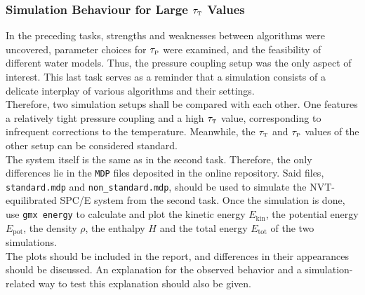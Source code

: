 \documentclass[9pt,tutorial]{livecoms}
\newcommand{\code}[1]{\colorbox{light-gray}{\texttt{#1}}}
\begin{document}
\subsubsection*{Simulation Behaviour for Large $\tau_\text{\tiny T}$ Values}
In the preceding tasks, strengths and weaknesses between algorithms were uncovered, parameter choices for $\tau_\text{\tiny P}$ were examined, and the feasibility of different water models. Thus, the pressure coupling setup was the only aspect of interest. This last task serves as a reminder that a simulation consists of a delicate interplay of various algorithms and their settings.\\
Therefore, two simulation setups shall be compared with each other. One features a relatively tight pressure coupling and a high $\tau_\text{\tiny T}$ value, corresponding to infrequent corrections to the temperature. Meanwhile, the $\tau_\text{\tiny T}$ and $\tau_\text{\tiny P}$ values of the other setup can be considered standard.\\
The system itself is the same as in the second task. Therefore, the only differences lie in the \texttt{MDP} files deposited in the online repository. Said files, \texttt{standard.mdp} and \texttt{non\_standard.mdp}, should be used to simulate the NVT-equilibrated SPC/E system from the second task. Once the simulation is done, use \code{gmx energy} to calculate and plot the kinetic energy $E_\text{kin}$, the potential energy $E_\text{pot}$, the density $\rho$, the enthalpy $H$ and the total energy $E_\text{tot}$ of the two simulations.\\
The plots should be included in the report, and differences in their appearances should be discussed. An explanation for the observed behavior and a simulation-related way to test this explanation should also be given.

\newpage
\end{document}
